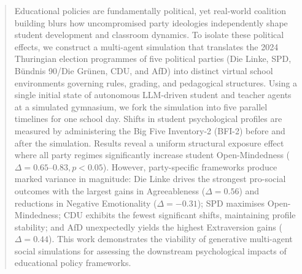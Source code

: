 \documentclass[english,master,buw]{webisthesis} %
\begin{document}
\begin{frontmatter}
\begin{abstract}
Educational policies are fundamentally political, yet real-world coalition building blurs how uncompromised party ideologies independently shape student development and classroom dynamics. To isolate these political effects, we construct a multi-agent simulation that translates the 2024 Thuringian election programmes of five political parties (Die Linke, SPD, B\"undnis 90/Die Gr\"unen, CDU, and AfD) into distinct virtual school environments governing rules, grading, and pedagogical structures. Using a single initial state of autonomous LLM-driven student and teacher agents at a simulated gymnasium, we fork the simulation into five parallel timelines for one school day. Shifts in student psychological profiles are measured by administering the Big Five Inventory-2 (BFI-2) before and after the simulation. Results reveal a uniform structural exposure effect where all party regimes significantly increase student Open-Mindedness ($\Delta = 0.65\text{--}0.83, p < 0.05$). However, party-specific frameworks produce marked variance in magnitude: Die Linke drives the strongest pro-social outcomes with the largest gains in Agreeableness ($\Delta = 0.56$) and reductions in Negative Emotionality ($\Delta = -0.31$); SPD maximises Open-Mindedness; CDU exhibits the fewest significant shifts, maintaining profile stability; and AfD unexpectedly yields the highest Extraversion gains ($\Delta = 0.44$). This work demonstrates the viability of generative multi-agent social simulations for assessing the downstream psychological impacts of educational policy frameworks.
\end{abstract}

\tableofcontents





\end{frontmatter}







\printbibliography



\end{document}
